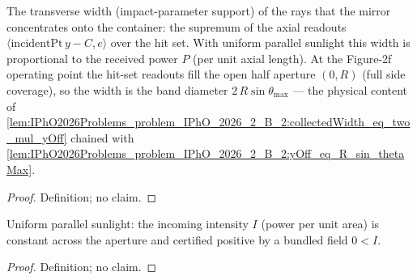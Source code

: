 
\begin{definition}
\label{def:IPhO2026Problems_problem_IPhO_2026_2_B_2:collectedWidth}
The transverse width (impact-parameter support) of the rays that the mirror
concentrates onto the container: the supremum of the axial readouts
$\langle \mathrm{incidentPt}\,y - C, e\rangle$ over the hit set.  With
uniform parallel sunlight this width is proportional to the received power
$P$ (per unit axial length).  At the Figure-2f operating point the
hit-set readouts fill the open half aperture $(0, R)$ (full side
coverage), so the width is the band diameter $2\,R\sin\theta_{\max}$ ---
the physical content of
\cref{lem:IPhO2026Problems_problem_IPhO_2026_2_B_2:collectedWidth_eq_two_mul_yOff}
chained with
\cref{lem:IPhO2026Problems_problem_IPhO_2026_2_B_2:yOff_eq_R_sin_thetaMax}.
\end{definition}
\begin{proof}
Definition; no claim.
\end{proof}

\begin{definition}
\label{def:IPhO2026Problems_problem_IPhO_2026_2_B_2:UniformIntensity}
Uniform parallel sunlight: the incoming intensity $I$ (power per unit area)
is constant across the aperture and certified positive by a bundled field
$0 < I$.
\end{definition}
\begin{proof}
Definition; no claim.
\end{proof}

